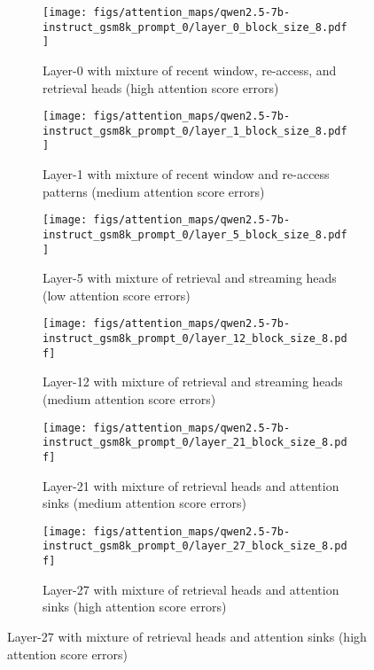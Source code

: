 \begin{figure}
    \centering
    \begin{subfigure}{0.72\columnwidth}
    \texttt{[image: figs/attention\_maps/qwen2.5-7b-instruct\_gsm8k\_prompt\_0/layer\_0\_block\_size\_8.pdf]}
    \caption{Layer-0 with mixture of recent window, re-access, and retrieval heads (high attention score errors)}
    \label{fig:attention_pattern_qwen2.5-7b-instruct_gsm8k_zeroshot_first_prompt_layer_0}
    \end{subfigure}
    \begin{subfigure}{0.72\columnwidth}
    \texttt{[image: figs/attention\_maps/qwen2.5-7b-instruct\_gsm8k\_prompt\_0/layer\_1\_block\_size\_8.pdf]}
    \caption{Layer-1 with mixture of recent window and re-access patterns (medium attention score errors)}
    \label{fig:attention_pattern_qwen2.5-7b-instruct_gsm8k_zeroshot_first_prompt_layer_1}
    \end{subfigure}
    \begin{subfigure}{0.72\columnwidth}
    \texttt{[image: figs/attention\_maps/qwen2.5-7b-instruct\_gsm8k\_prompt\_0/layer\_5\_block\_size\_8.pdf]}
    \caption{Layer-5 with mixture of retrieval and streaming heads (low attention score errors)}
    \label{fig:attention_pattern_qwen2.5-7b-instruct_gsm8k_zeroshot_first_prompt_layer_5}
    \end{subfigure}
    \begin{subfigure}{0.72\columnwidth}
    \texttt{[image: figs/attention\_maps/qwen2.5-7b-instruct\_gsm8k\_prompt\_0/layer\_12\_block\_size\_8.pdf]}
    \caption{Layer-12 with mixture of retrieval and streaming heads (medium attention score errors)}
    \label{fig:attention_pattern_qwen2.5-7b-instruct_gsm8k_zeroshot_first_prompt_layer_12}
    \end{subfigure}
    \begin{subfigure}{0.72\columnwidth}
    \texttt{[image: figs/attention\_maps/qwen2.5-7b-instruct\_gsm8k\_prompt\_0/layer\_21\_block\_size\_8.pdf]}
    \caption{Layer-21 with mixture of retrieval heads and attention sinks (medium attention score errors)}
    \label{fig:attention_pattern_qwen2.5-7b-instruct_gsm8k_zeroshot_first_prompt_layer_26}
    \end{subfigure}
    \begin{subfigure}{0.72\columnwidth}
    \texttt{[image: figs/attention\_maps/qwen2.5-7b-instruct\_gsm8k\_prompt\_0/layer\_27\_block\_size\_8.pdf]}
    \caption{Layer-27 with mixture of retrieval heads and attention sinks (high attention score errors)}

\end{subfigure}
\end{figure}
